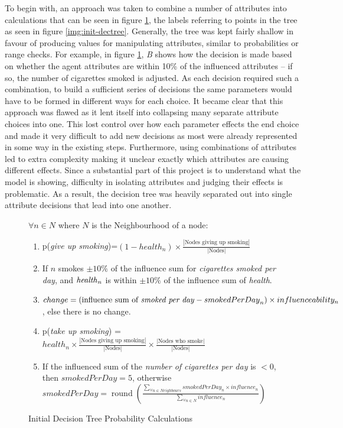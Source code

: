\documentclass[]{report}
\begin{document}
To begin with, an approach was taken to combine a number of attributes into calculations that can be seen in figure \ref{eq:v0.9probs}, the labels referring to points in the tree as seen in figure \ref{img:init-dectree}. Generally, the tree was kept fairly shallow in favour of producing values for manipulating attributes, similar to probabilities or range checks. For example, in figure \ref{eq:v0.9probs}, \emph{B} shows how the decision is made based on whether the agent attributes are within 10\% of the influenced attributes – if so, the number of cigarettes smoked is adjusted. As each decision required such a combination, to build a sufficient series of decisions the same parameters would have to be formed in different ways for each choice. It became clear that this approach was flawed as it lent itself into collapsing many separate attribute choices into one. This lost control over how each parameter effects the end choice and made it very difficult to add new decisions as most were already represented in some way in the existing steps. Furthermore, using combinations of attributes led to extra complexity making it unclear exactly which attributes are causing different effects. Since a substantial part of this project is to understand what the model is showing, difficulty in isolating attributes and judging their effects is problematic. As a result, the decision tree was heavily separated out into single attribute decisions that lead into one another.

\begin{figure}
	$\forall n \in N$ where $N$ is the Neighbourhood of a node:
	\begin{enumerate}
		\item p(\emph{give up smoking})=$(1-health_{n}) \times \frac{|\text{Nodes giving up smoking}|}{|\text{Nodes}|}$ \\
		\item If $n$ smokes $\pm10\%$ of the influence sum for \emph{cigarettes smoked per day}, and $\text{\emph{health}}_{n}$ is within $\pm10\%$ of the influence sum of \emph{health}. \\
		\item $change = (\text{influence sum of \emph{smoked per day}} - {smokedPerDay}_{n}) \times influenceability_{n}$, else there is no change. \\
		\item p(\emph{take up smoking}) = $health_{n} \times \frac{|\text{Nodes giving up smoking}|}{|\text{Nodes}|} \times \frac{|\text{Nodes who smoke}|}{|\text{Nodes}|}$ \\
		\item If the influenced sum of the \emph{number of cigarettes per day} is $< 0$, then $smokedPerDay = 5$, otherwise \\
		$smokedPerDay = \operatorname{round}(\frac{\sum_{\forall n \in Neighbours} smokedPerDay_{n} \times influence_{n}}{\sum_{\forall n \in N} influence_{n}})$
	\end{enumerate}
	\caption{Initial Decision Tree Probability Calculations}
	\label{eq:v0.9probs}
\end{figure}
\end{document}
